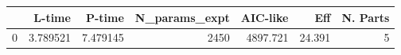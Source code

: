 \begin{tabular}{lrrrrrr}
\toprule
{} &    L-time &    P-time &  N\_params\_expt &  AIC-like &     Eff &  N. Parts \\
\midrule
0 &  3.789521 &  7.479145 &           2450 &  4897.721 &  24.391 &         5 \\
\bottomrule
\end{tabular}
